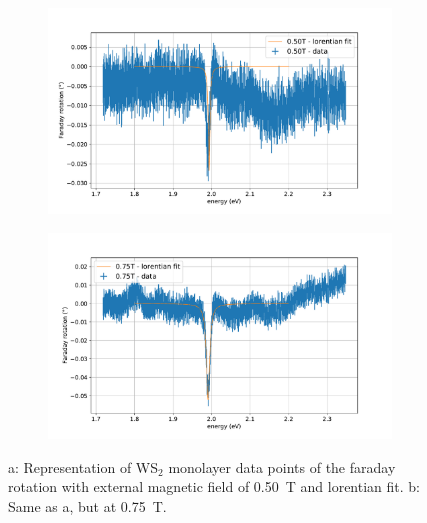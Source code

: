\begin{figure}[H]
    \centering
    \begin{subfigure}{0.47\textwidth}
        \centering
        \includegraphics[width=1.0\textwidth]{plots/WS2_500mT.pdf}
    \caption{}
    \end{subfigure}
    \begin{subfigure}{0.47\textwidth}
        \centering
        \includegraphics[width=\textwidth]{plots/WS2_750mT.pdf}
        \caption{}
    \end{subfigure}
    \caption{a: Representation of WS$_2$ monolayer data points of the faraday rotation with external magnetic field of \SI{0.50}{\tesla} and lorentian fit. b: Same as a, but at \SI{0.75}{\tesla}.} %
\end{figure}

